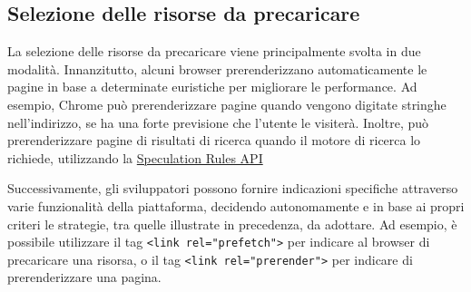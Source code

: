 \subsection{Selezione delle risorse da precaricare}
La selezione delle risorse da precaricare viene principalmente svolta in due modalità.
Innanzitutto, alcuni browser prerenderizzano automaticamente le pagine in base a determinate euristiche per migliorare le performance. Ad esempio, Chrome può prerenderizzare pagine quando vengono digitate stringhe nell'indirizzo, se ha una forte previsione che l'utente le visiterà. Inoltre, può prerenderizzare pagine di risultati di ricerca quando il motore di ricerca lo richiede, utilizzando la \href{https://developer.mozilla.org/en-US/docs/Web/API/Speculation_Rules_API}{Speculation Rules API}

Successivamente, gli sviluppatori possono fornire indicazioni specifiche attraverso varie funzionalità della piattaforma, decidendo autonomamente e in base ai propri criteri le strategie, tra quelle illustrate in precedenza, da adottare. Ad esempio, è possibile utilizzare il tag \texttt{<link rel="prefetch">} per indicare al browser di precaricare una risorsa, o il tag \texttt{<link rel="prerender">} per indicare di prerenderizzare una pagina.



